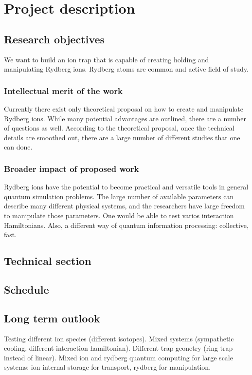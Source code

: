 \section{Project description}

\subsection{Research objectives}

We want to build an ion trap that is capable of creating holding and manipulating Rydberg ions. Rydberg atoms are common and active field of study. 

\subsubsection{Intellectual merit of the work}

Currently there exist only theoretical proposal on how to create and manipulate Rydberg ions. While many potential advantages are outlined, there are a number of questions as well. According to the theoretical proposal, once the technical details are smoothed out, there are a large number of different studies that one can done.

\subsubsection{Broader impact of proposed work}

Rydberg ions have the potential to become practical and versatile tools in general quantum simulation problems. The large number of available parameters can describe many different physical systems, and the researchers have large freedom to manipulate those parameters. One would be able to test varios interaction Hamiltonians. Also, a different way of quantum information processing: collective, fast.

\subsection{Technical section}

\subsection{Schedule}

\subsection{Long term outlook}

Testing different ion species (different isotopes). Mixed systems (sympathetic cooling, different interaction hamiltonian). Different trap geonetry (ring trap instead of linear). Mixed ion and rydberg quantum computing for large scale systems: ion internal storage for transport, rydberg for manipulation.